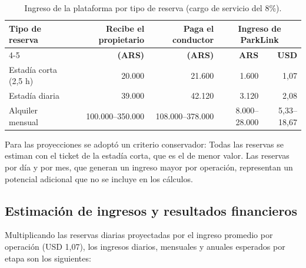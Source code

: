 \begin{table}[H]
    \centering
    \caption{Ingreso de la plataforma por tipo de reserva (cargo de servicio del 8\%).}
    \vspace{0.2cm}
    \small
    \renewcommand{\arraystretch}{1.3}
    \begin{tabular}{l r r r r}
        \toprule
        \textbf{Tipo de reserva} & \textbf{Recibe el propietario} & \textbf{Paga el conductor} & \multicolumn{2}{c}{\textbf{Ingreso de ParkLink}} \\
        \cmidrule(lr){4-5}
         & \textbf{(ARS)} & \textbf{(ARS)} & \textbf{ARS} & \textbf{USD} \\
        \midrule
        Estadía corta (2,5 h) & 20.000 & 21.600 & 1.600 & 1,07 \\
        Estadía diaria & 39.000 & 42.120 & 3.120 & 2,08 \\
        Alquiler mensual & 100.000--350.000 & 108.000--378.000 & 8.000--28.000 & 5,33--18,67 \\
        \bottomrule
    \end{tabular}
    \label{tab:ingreso_por_reserva}
\end{table}

Para las proyecciones se adoptó un criterio conservador: Todas las reservas se estiman con el ticket de la estadía corta, que es el de menor valor. Las reservas por día y por mes, que generan un ingreso mayor por operación, representan un potencial adicional que no se incluye en los cálculos.

\subsection{Estimación de ingresos y resultados financieros}

Multiplicando las reservas diarias proyectadas por el ingreso promedio por operación (USD 1,07), los ingresos diarios, mensuales y anuales esperados por etapa son los siguientes:

\begin{table}[H]
    \centering
    \caption{Ingresos proyectados por etapa (en USD).}
    \vspace{0.2cm}
    \label{tab:ingresos_etapas}
\end{table}

